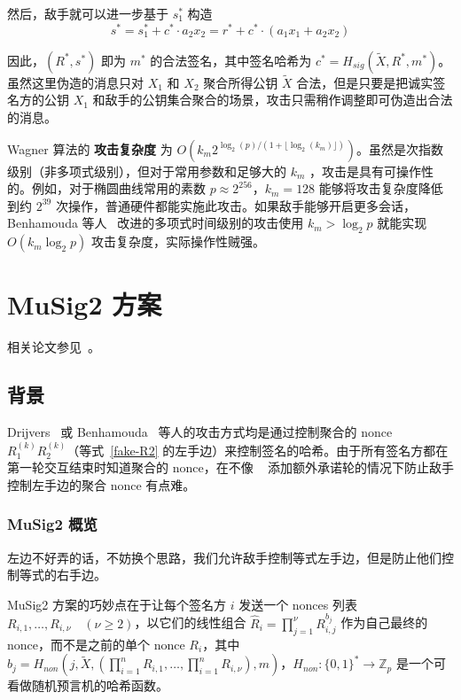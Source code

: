\documentclass[a4paper,10pt]{article}
\newcommand{\bZ}{\mathbb{Z}}
\begin{document}
然后，敌手就可以进一步基于 \(s_1^*\) 构造 
\[
  s^* = s_1^* + c^*\cdot a_2x_2 = r^* + c^*\cdot (a_1 x_1+a_2 x_2)
\]

因此，\((R^*,s^*)\) 即为 \(m^*\) 的合法签名，其中签名哈希为 \(c^* = H_{sig}(\tilde{X},R^*,m^*)\)。
虽然这里伪造的消息只对 \(X_1\) 和 \(X_2\) 聚合所得公钥 \(\tilde{X}\) 合法，但是只要是把诚实签名方的公钥 \(X_1\) 和敌手的公钥集合聚合的场景，攻击只需稍作调整即可伪造出合法的消息。

Wagner 算法的 \textbf{攻击复杂度} 为 \(O(k_m 2^{\log_2(p)/(1+\lfloor \log_2(k_m) \rfloor)})\)。虽然是次指数级别（非多项式级别），但对于常用参数和足够大的 \(k_m\) ，攻击是具有可操作性的。例如，对于椭圆曲线常用的素数 \(p\approx 2^{256}\)，\(k_m=128\) 能够将攻击复杂度降低到约 \(2^{39}\) 次操作，普通硬件都能实施此攻击。如果敌手能够开启更多会话，Benhamouda 等人~\cite{cryptoeprint:2020:945} 改进的多项式时间级别的攻击使用 \(k_m>\log_2 p\) 就能实现 \(O(k_m\log_2 p)\) 攻击复杂度，实际操作性贼强。

\section{MuSig2 方案}

相关论文参见~\cite{cryptoeprint:2020:1261,jonasnick2020MuSig2}。

\subsection{背景}
Drijvers~\cite{2019On} 或 Benhamouda~\cite{cryptoeprint:2020:945} 等人的攻击方式均是通过控制聚合的 nonce \(R_1^{(k)} R_2^{(k)}\)（等式~\eqref{fake-R2} 的左手边）来控制签名的哈希。由于所有签名方都在第一轮交互结束时知道聚合的 nonce，在不像 ~\cite{cryptoeprint:2018:068} 添加额外承诺轮的情况下防止敌手控制左手边的聚合 nonce 有点难。

\subsubsection{MuSig2 概览}
左边不好弄的话，不妨换个思路，我们允许敌手控制等式左手边，但是防止他们控制等式的右手边。

MuSig2 方案的巧妙点在于让每个签名方 \(i\) 发送一个 nonces 列表 \(R_{i,1},\dots,R_{i,\nu}\quad (\nu\geq 2)\)，以它们的线性组合 \(\hat{R}_i=\prod_{j=1}^{\nu}R_{i,j}^{b_j}\) 作为自己最终的 nonce，而不是之前的单个 nonce \(R_i\)，其中 \( b_j=H_{non}(j,\tilde{X},(\prod_{i=1}^n R_{i,1},\dots,\prod_{i=1}^n R_{i,\nu}),m) \)，\(H_{non}: \{0,1\}^*\rightarrow \bZ_p\) 是一个可看做随机预言机的哈希函数。
\end{document}
